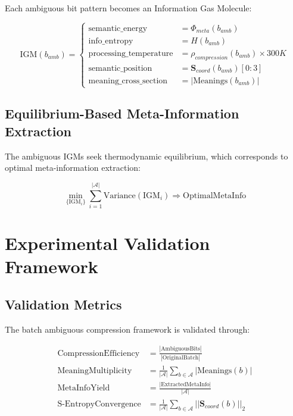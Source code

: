 \documentclass[12pt,a4paper]{article}
\theoremstyle{definition}
\begin{document}
Each ambiguous bit pattern becomes an Information Gas Molecule:

\begin{equation}
\text{IGM}(b_{amb}) = \begin{cases}
\text{semantic\_energy} &= \Phi_{meta}(b_{amb}) \\
\text{info\_entropy} &= H(b_{amb}) \\
\text{processing\_temperature} &= \rho_{compression}(b_{amb}) \times 300K \\
\text{semantic\_position} &= \mathbf{S}_{coord}(b_{amb})[0:3] \\
\text{meaning\_cross\_section} &= |\text{Meanings}(b_{amb})|
\end{cases}
\end{equation}

\subsection{Equilibrium-Based Meta-Information Extraction}

The ambiguous IGMs seek thermodynamic equilibrium, which corresponds to optimal meta-information extraction:

\begin{equation}
\min_{\{\text{IGM}_i\}} \sum_{i=1}^{|\mathcal{A}|} \text{Variance}(\text{IGM}_i) \Rightarrow \text{OptimalMetaInfo}
\end{equation}

\section{Experimental Validation Framework}

\subsection{Validation Metrics}

The batch ambiguous compression framework is validated through:

\begin{align}
\text{CompressionEfficiency} &= \frac{|\text{AmbiguousBits}|}{|\text{OriginalBatch}|} \\
\text{MeaningMultiplicity} &= \frac{1}{|\mathcal{A}|} \sum_{b \in \mathcal{A}} |\text{Meanings}(b)| \\
\text{MetaInfoYield} &= \frac{|\text{ExtractedMetaInfo}|}{|\mathcal{A}|} \\
\text{S-EntropyConvergence} &= \frac{1}{|\mathcal{A}|} \sum_{b \in \mathcal{A}} ||\mathbf{S}_{coord}(b)||_2
\end{align}
\end{document}
